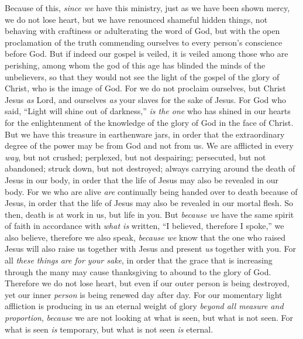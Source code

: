 \begin{biblechapter} %
 Because of this, \textit{since we} have this ministry, just as we have been shown mercy, we do not lose heart,
\verse but we have renounced shameful hidden things, not behaving with craftiness or adulterating the word of God, but with the open proclamation of the truth commending ourselves to every person’s conscience before God.
\verse But if indeed our gospel is veiled, it is veiled among those who are perishing,
\verse among whom the god of this age has blinded the minds of the unbelievers, so that they would not see the light of the gospel of the glory of Christ, who is the image of God.
\verse For we do not proclaim ourselves, but Christ Jesus \textit{as} Lord, and ourselves \textit{as} your slaves for the sake of Jesus.
\verse For God who said, “Light will shine out of darkness,” \textit{is the one} who has shined in our hearts for the enlightenment of the knowledge of the glory of God in the face of Christ.
 But we have this treasure in earthenware jars, in order that the extraordinary degree of the power may be from God and not from us.
\verse We are afflicted in every \textit{way}, but not crushed; perplexed, but not despairing;
\verse persecuted, but not abandoned; struck down, but not destroyed;
\verse always carrying around the death of Jesus in our body, in order that the life of Jesus may also be revealed in our body.
\verse For we who are alive \textit{are} continually being handed over to death because of Jesus, in order that the life of Jesus may also be revealed in our mortal flesh.
\verse So then, death is at work in us, but life in you.
\verse But \textit{because we} have the same spirit of faith in accordance with \textit{what is} written, “I believed, therefore I spoke,” we also believe, therefore we also speak,
\verse \textit{because we} know that the one who raised Jesus will also raise us together with Jesus and present \textit{us} together with you.
\verse For all \textit{these things} \textit{are for your sake}, in order that the grace that is increasing through the many may cause thanksgiving to abound to the glory of God.
\verse Therefore we do not lose heart, but even if our outer person is being destroyed, yet our inner \textit{person} is being renewed day after day.
\verse For our momentary light affliction is producing in us an eternal weight of glory \textit{beyond all measure and proportion},
\verse \textit{because} we are not looking at what is seen, but what is not seen. For what is seen \textit{is} temporary, but what is not seen \textit{is} eternal.
\end{biblechapter}

